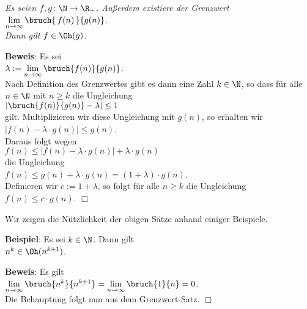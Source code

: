 \begin{Satz} \label{limit}
{\em
  Es seien $f,g \colon \N \rightarrow {\R_+}$.  Au{\ss}erdem existiere der Grenzwert \\[0.1cm]
  \hspace*{1.3cm} $\lim\limits_{n \rightarrow \infty} \bruch{\,f(n)\,}{g(n)}$.  \\[0.1cm]
  Dann gilt $f \in \Oh(g)$. 
}
\end{Satz}
\textbf{Beweis}: Es sei \\[0.1cm]
\hspace*{1.3cm} $\lambda := \lim\limits_{n \rightarrow \infty} \bruch{f(n)}{g(n)}$.  \\[0.1cm]
Nach Definition des Grenzwertes gibt es dann eine Zahl $k \in \N$, so dass 
f\"ur alle $n\in \N$ mit $n \geq k$ die Ungleichung \\[0.1cm]
\hspace*{1.3cm} $\left| \bruch{f(n)}{g(n)} - \lambda \right| \leq 1$ \\[0.1cm]
gilt.  Multiplizieren wir diese Ungleichung mit $g(n)$, so erhalten wir \\[0.1cm]
\hspace*{1.3cm} $|f(n) - \lambda \cdot g(n)| \leq g(n)$. \\[0.1cm]
Daraus folgt wegen \\[0.1cm]
\hspace*{1.3cm} $f(n) \leq \bigl|f(n) - \lambda \cdot g(n)\bigr| + \lambda \cdot g(n)$ \\[0.1cm]
die Ungleichung \\[0.1cm]
\hspace*{1.3cm} $f(n) \leq g(n) + \lambda \cdot g(n) = (1 + \lambda) \cdot g(n)$. \\[0.1cm]
Definieren wir  $c := 1 +  \lambda$, 
so folgt f\"ur alle $n \geq k$ die Ungleichung $f(n) \leq c \cdot g(n)$. \hspace*{\fill} $\Box$
\vspace*{0.3cm}

\noindent
Wir zeigen die N\"utzlichkeit der obigen S\"atze anhand einiger Beispiele.
\vspace*{0.3cm}

\noindent
\textbf{Beispiel}: Es sei $k \in \N$.  Dann gilt\\[0.1cm]
\hspace*{1.3cm} $n^k \in \Oh(n^{k+1})$.
\vspace*{0.3cm}

\noindent
\textbf{Beweis}: Es gilt \\[0.1cm]
\hspace*{1.3cm} 
$\lim\limits_{n \rightarrow \infty} \bruch{n^{k}}{n^{k+1}} = \lim\limits_{n \rightarrow   \infty} \bruch{1}{n} = 0$.
\\[0.1cm]
Die Behauptung folgt nun aus dem Grenzwert-Satz. \hspace*{\fill} $\Box$
\vspace*{0.3cm}

